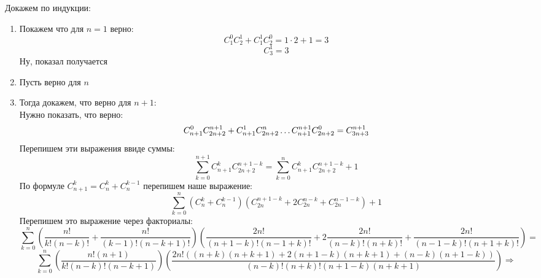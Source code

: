 \documentclass{report}
\begin{document}
\sol Докажем по индукции:
\begin{enumerate}
	\item Покажем что для $n=1$ верно:\\
		\begin{equation*}
			C_1^0C_2^1+C_1^1C_2^0=1\cdot2+1=3
		\end{equation*}
		\begin{equation*}
			C_3^1=3
		\end{equation*}
	Ну, показал получается
	\item Пусть верно для $n$\\
	\item Тогда докажем, что верно для $n+1$:\\
		Нужно показать, что верно:
		\begin{equation*}
			C_{n+1}^0C_{2n+2}^{n+1} + C_{n+1}^1C_{2n+2}^n\mathellipsis C_{n+1}^{n+1}C_{2n+2}^0=C_{3n+3}^{n+1}
		\end{equation*}
		Перепишем эти выражения ввиде суммы:\\
		\begin{equation*}
		\sum_{k=0}^{n+1}C_{n+1}^kC_{2n+2}^{n+1-k}=\sum_{k=0}^{n}C_{n+1}^kC_{2n+2}^{n+1-k}+1
		\end{equation*}
		По формуле $C_{n+1}^k=C_n^k+C_n^{k-1}$ перепишем наше выражение:\\
		\begin{equation*}
			\sum_{k=0}^{n} (C_{n}^k+C_{n}^{k-1}) (C_{2n}^{n+1-k}+  2C_{2n}^{n-k}+ C_{2n}^{n-1-k}) + 1
		\end{equation*}
		Перепишем это выражение через факториалы:
		\begin{equation*}
			\sum_{k=0}^{n} \left(\dfrac{n!}{k!(n-k)!}+\dfrac{n!}{(k-1)!(n-k+1)!}\right)\left(\dfrac{2n!}{(n+1-k)!(n-1+k)!}+2\dfrac{2n!}{(n-k)!(n+k)!}+\dfrac{2n!}{(n-1-k)!(n+1+k)!}\right)=
		\end{equation*}
		\begin{equation*}
			\sum_{k=0}^{n} \left(\dfrac{n!(n+1)}{k!(n-k)!(n-k+1)}\right)\left(\dfrac{2n!((n+k)(n+k+1)+2(n+1-k)(n+k+1)+(n-k)(n+1-k))}{(n-k)!(n+k)!(n+1-k)(n+k+1)}\right) \Rightarrow
		\end{equation*}

\end{enumerate}
\end{document}
